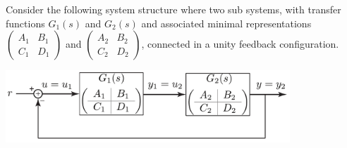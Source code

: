 \documentclass[twoside]{article}
\begin{document}
Consider the following system structure where two sub systems, with transfer functions 
$G_1(s)$ and $G_2(s)$ and associated minimal representations $\left( \begin{array}{c|c} A_1 & B_1 \\ \hline
C_1 & D_1 \end{array} \right)$ and $\left( \begin{array}{c|c} A_2 & B_2 \\ \hline
C_2 & D_2 \end{array} \right)$, connected in a unity feedback configuration. 
		
\begin{center}
  \begin{minipage}[h]{0.9\linewidth}
    \begin{center}
      \includegraphics[width=0.8\textwidth]{feedback}
    \end{center}
  \end{minipage}
    \end{center}
\end{document}
